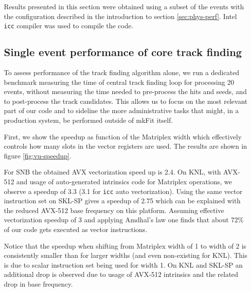 \documentclass{webofc}
\def\mkfit{mkFit\xspace}
\def\stt#1{{\small\texttt{#1}}}
\begin{document}
Results presented in this section were obtained using a subset of the 
events with the configuration described in the introduction to section 
\ref{sec:phys-perf}. Intel \stt{icc} compiler was used to compile the
code.


\subsection{Single event performance of core track finding}

To assess performance of the track finding algorithm alone, we run a dedicated
benchmark measuring the time of central track finding loop for processing 20 
events, without measuring the time needed to pre-process the hits and seeds, 
and to post-process the track candidates. This allows us to focus on the most 
relevant part of our code and to sideline the more administrative tasks that 
might, in a production system, be performed outside of \mkfit itself.

First, we show the speedup as function of the Matriplex width which
effectively controls how many slots in the vector registers are used. The
results are shown in figure \ref{fig:vu-speedup}.

For SNB the obtained AVX vectorization speed up is 2.4. On KNL, with AVX-512
and usage of auto-generated intrinsics code for Matriplex operations, we
observe a speedup of 3.3 (3.1 for \stt{icc} auto vectorization). Using the same
vector instruction set on SKL-SP gives a speedup of 2.75 which can be explained
with the reduced AVX-512 base frequency on this platform. Assuming effective
vectorization speedup of 3 and applying Amdhal's law one finds that about 72\%
of our code gets executed as vector instructions.

Notice that the speedup when shifting from Matriplex width of 1 to width of 2
is consistently smaller than for larger widths (and even non-existing for
KNL). This is due to scalar instruction set being used for width 1. On KNL and
SKL-SP an additional drop is observed due to usage of AVX-512 intrinsics and the
related drop in base frequency.
\end{document}
